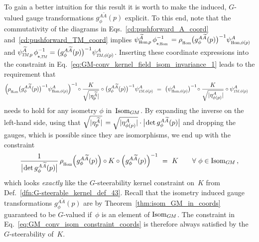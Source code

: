 To gain a better intuition for this result it is worth to make the induced, $G$-valued gauge transformations $g_\phi^{A\widetilde{A}}(p)$ explicit.
To this end, note that the commutativity of the diagrams in Eqs.~\eqref{cd:pushforward_A_coord} and~\eqref{cd:pushforward_TM_coord} implies
$\psiHomp^{\widetilde{A}}\, \dphiHominv = \rhoHom\big( g_\phi^{A\widetilde{A}}(p) \big)^{-1} \psiHomphip^A$ and
$\psiTMp^{\widetilde{A}}\,  \dphiTMinv  =        \big( g_\phi^{A\widetilde{A}}(p) \big)^{-1} \psiTMphip^A$.
Inserting these coordinate expressions into the constraint in Eq.~\eqref{eq:GM-conv_kernel_field_isom_invariance_1} leads to the requirement that
\begin{align}\label{eq:GM-conv_kernel_field_isom_invariance_2}
    \Big(\mkern-1.5mu \rhoHom\big( g_\phi^{A\widetilde{A}}(p) \big)^{-1} \psiHomphip^A \mkern-1.5mu\Big)^{-1}
    \!\circ \frac{K}{\sqrt{|\eta_p^{\widetilde{A}}|}} \circ \big( g_\phi^{A\widetilde{A}}(p) \big)^{-1} \psiTMphip^A
    \ &=\ \big(\psiHomphip^A \big)^{-1} \!\circ \frac{K}{\sqrt{|\eta_{\phi(p)}^A|}} \circ \psiTMphip^A
\end{align}
needs to hold for any isometry $\phi$ in~$\operatorname{Isom}_{G\mkern-1.4muM}$.
By expanding the inverse on the left-hand side, using that
${\sqrt{|\eta_p^{\widetilde{A}}|} \,= \sqrt{|\eta_{\phi(p)}^A|} \cdot \big|\mkern-2mu \det g^{A\widetilde{A}}_\phi(p) \big|}$
and dropping the gauges, which is possible since they are isomorphisms, we end up with the constraint
\begin{align}\label{eq:GM_conv_isom_constraint_coords}
    \frac{1}{\big|\mkern-2mu \det g^{A\widetilde{A}}_\phi(p) \big|} \,
    \rhoHom\Big(g^{A\widetilde{A}}_\phi(p)\Big) \circ K \circ \Big(g^{A\widetilde{A}}_\phi(p)\Big)^{-1} \ =\ K
    \qquad \forall\ \phi \in \IsomGM \,,
\end{align}
which looks \emph{exactly} like the $G$-steerability kernel constraint on~$K$ from Def.~\ref{dfn:G-steerable_kernel_def_43}.
Recall that the isometry induced gauge transformations $g_\phi^{A\widetilde{A}}(p)$ are by Theorem~\ref{thm:isom_GM_in_coords} guaranteed to be $G$-valued if~$\phi$ is an element of $\operatorname{Isom}_{G\mkern-1.4muM}$.
The constraint in Eq.~\eqref{eq:GM_conv_isom_constraint_coords} is therefore always satisfied by the $G$-steerability of~$K$.

